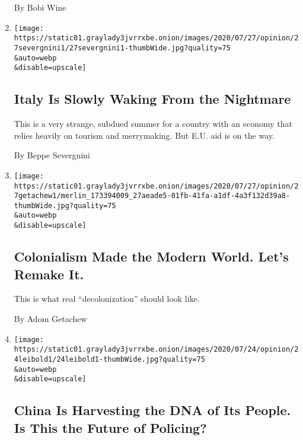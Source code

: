\begin{enumerate}
  By Bobi Wine
\item
  \href{/2020/07/27/opinion/italy-coronavirus.html}{}

  \texttt{[image: https://static01.graylady3jvrrxbe.onion/images/2020/07/27/opinion/27severgnini1/27severgnini1-thumbWide.jpg?quality=75\\\&auto=webp\\\&disable=upscale]}

  \hypertarget{italy-is-slowly-waking-from-the-nightmare}{%
  \subsection{Italy Is Slowly Waking From the
  Nightmare}\label{italy-is-slowly-waking-from-the-nightmare}}

  This is a very strange, subdued summer for a country with an economy
  that relies heavily on tourism and merrymaking. But E.U. aid is on the
  way.

  By Beppe Severgnini
\item
  \href{/2020/07/27/opinion/sunday/decolonization-statues.html}{}

  \texttt{[image: https://static01.graylady3jvrrxbe.onion/images/2020/07/27/opinion/27getachew1/merlin\_173394009\_27aeade5-01fb-41fa-a1df-4a3f132d39a8-thumbWide.jpg?quality=75\\\&auto=webp\\\&disable=upscale]}

  \hypertarget{colonialism-made-the-modern-world-lets-remake-it}{%
  \subsection{Colonialism Made the Modern World. Let's Remake
  It.}\label{colonialism-made-the-modern-world-lets-remake-it}}

  This is what real ``decolonization'' should look like.

  By Adom Getachew
\item
  \href{/2020/07/24/opinion/china-dna-police.html}{}

  \texttt{[image: https://static01.graylady3jvrrxbe.onion/images/2020/07/24/opinion/24leibold1/24leibold1-thumbWide.jpg?quality=75\\\&auto=webp\\\&disable=upscale]}

  \hypertarget{china-is-harvesting-the-dna-of-its-people-is-this-the-future-of-policing}{%
  \subsection{China Is Harvesting the DNA of Its People. Is This the
  Future of
  Policing?}\label{china-is-harvesting-the-dna-of-its-people-is-this-the-future-of-policing}}


\end{enumerate}
